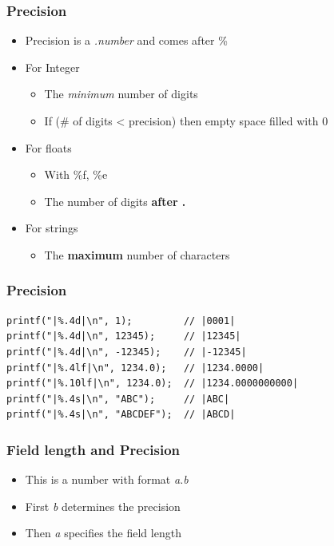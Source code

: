 \documentclass{../c-lecture}
\begin{document}
\begin{frame}
  \frametitle{Precision}
  \begin{itemize}
    \item Precision is a \textit{\color{LimeGreen} .number} and comes after \%

    \item For Integer
    \begin{itemize}
      \item The \textit{\color{LimeGreen} minimum} number of digits
      \item If (\# of digits < precision) then empty space filled with 0
    \end{itemize}

    \item For floats
    \begin{itemize}
      \item With \%f, \%e
      \item The number of digits \textbf{\color{Cyan} after .}
    \end{itemize}

    \item For strings
    \begin{itemize}
      \item The \textbf{\color{Orange} maximum} number of characters
    \end{itemize}
  \end{itemize}
\end{frame}

\begin{frame}[fragile]
  \frametitle{Precision}
  \begin{verbatim}
printf("|%.4d|\n", 1);         // |0001|
printf("|%.4d|\n", 12345);     // |12345|
printf("|%.4d|\n", -12345);    // |-12345|
printf("|%.4lf|\n", 1234.0);   // |1234.0000|
printf("|%.10lf|\n", 1234.0);  // |1234.0000000000|
printf("|%.4s|\n", "ABC");     // |ABC|
printf("|%.4s|\n", "ABCDEF");  // |ABCD|
  \end{verbatim}
\end{frame}

\begin{frame}
  \frametitle{Field length and Precision}
  \begin{itemize}
    \item This is a number with format \textit{\color{Cyan} a.b}
    \item First \textit{\color{Orange} b} determines the precision
    \item Then \textit{\color{LimeGreen} a} specifies the field length
  \end{itemize}
\end{frame}
\end{document}
